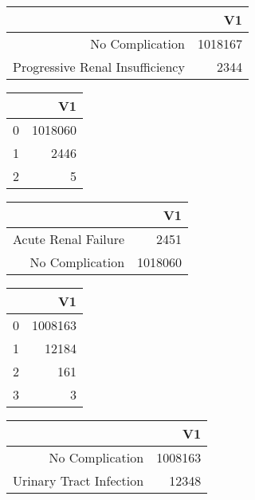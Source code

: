 \bigskip\bigskip
\centering
\begin{tabular}{rr}
  \hline
 & V1 \\ 
  \hline
No Complication & 1018167 \\ 
  Progressive Renal Insufficiency & 2344 \\ 
   \hline
\end{tabular}

\bigskip\bigskip
\centering
\begin{tabular}{rr}
  \hline
 & V1 \\ 
  \hline
0 & 1018060 \\ 
  1 & 2446 \\ 
  2 &   5 \\ 
   \hline
\end{tabular}

\bigskip\bigskip
\centering
\begin{tabular}{rr}
  \hline
 & V1 \\ 
  \hline
Acute Renal Failure & 2451 \\ 
  No Complication & 1018060 \\ 
   \hline
\end{tabular}

\bigskip\bigskip
\centering
\begin{tabular}{rr}
  \hline
 & V1 \\ 
  \hline
0 & 1008163 \\ 
  1 & 12184 \\ 
  2 & 161 \\ 
  3 &   3 \\ 
   \hline
\end{tabular}

\bigskip\bigskip
\centering
\begin{tabular}{rr}
  \hline
 & V1 \\ 
  \hline
No Complication & 1008163 \\ 
  Urinary Tract Infection & 12348 \\ 
   \hline
\end{tabular}

